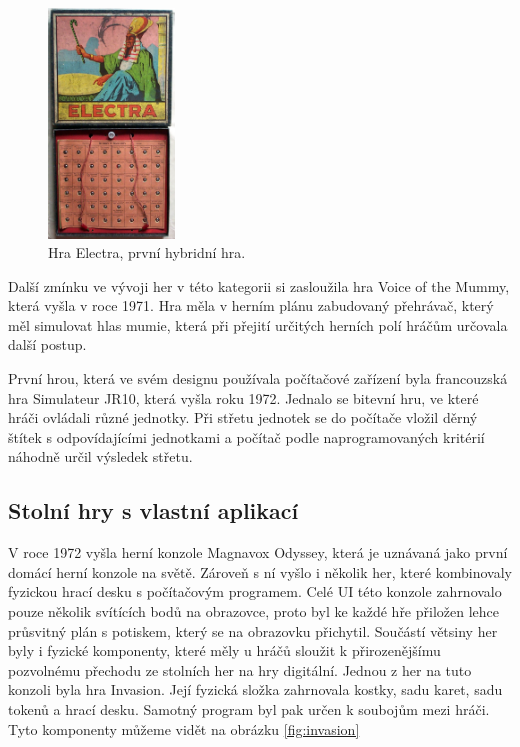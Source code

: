 \begin{figure}[H]
    \centering
    \includegraphics[width=0.3\textwidth]{resources/figures/electra.jpg}
    \caption{Hra Electra, první hybridní hra.\cite{history_of_hybrid_games}}
    \label{fig:electra}
\end{figure}

Další zmínku ve vývoji her v této kategorii si zasloužila hra Voice of the Mummy, která vyšla v roce 1971. Hra měla v herním plánu zabudovaný přehrávač, který měl simulovat hlas mumie, která při přejití určitých herních polí hráčům určovala další postup.\cite{voice_of_the_mummy}

První hrou, která ve svém designu používala počítačové zařízení byla francouzská hra Simulateur JR10, která vyšla roku 1972. Jednalo se bitevní hru, ve které hráči ovládali různé jednotky. Při střetu jednotek se do počítače vložil děrný štítek s odpovídajícími jednotkami a počítač podle naprogramovaných kritérií náhodně určil výsledek střetu.\cite{simulateur_jr10}

\subsection{Stolní hry s vlastní aplikací}
V roce 1972 vyšla herní konzole Magnavox Odyssey, která je uznávaná jako první domácí herní konzole na světě. Zároveň s ní vyšlo i několik her, které kombinovaly fyzickou hrací desku s počítačovým programem. Celé UI této konzole zahrnovalo pouze několik svítících bodů na obrazovce, proto byl ke každé hře přiložen lehce průsvitný plán s potiskem, který se na obrazovku přichytil. Součástí větsiny her byly i fyzické komponenty, které měly u hráčů sloužit k přirozenějšímu pozvolnému přechodu ze stolních her na hry digitální.\cite{magnavox_odyssey} Jednou z her na tuto konzoli byla hra Invasion. Její fyzická složka zahrnovala kostky, sadu karet, sadu tokenů a hrací desku. Samotný program byl pak určen k soubojům mezi hráči. Tyto komponenty můžeme vidět na obrázku \ref{fig:invasion}\cite{invasion,invasion_gameplay}

